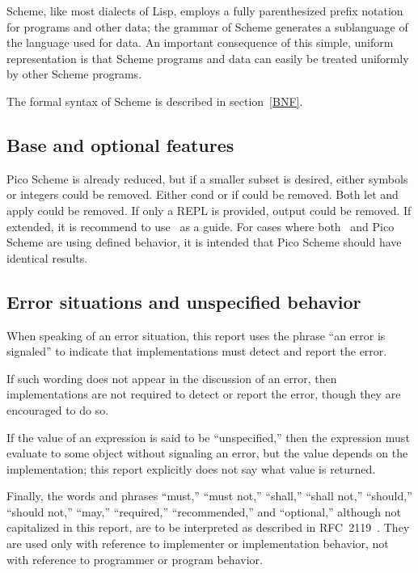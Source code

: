 Scheme, like most dialects of Lisp, employs a fully parenthesized prefix
notation for programs and other data; the grammar of Scheme generates a
sublanguage of the language used for data.  An important
consequence of this simple, uniform representation is that
Scheme programs and data can easily be treated uniformly by other Scheme programs.

The formal syntax of Scheme is described in section~\ref{BNF}.

\subsection{Base and optional features}
\label{qualifiers}

Pico Scheme is already reduced, but if a smaller subset is desired,
either symbols or integers could be removed. Either {\cf cond} or {\cf
  if} could be removed. Both {\cf let} and {\cf apply} could be
removed. If only a REPL is provided, output could be removed.
If extended, it is recommend to use \rsevenrs\ as a
guide. For cases where both \rsevenrs\ and Pico Scheme are using
defined behavior, it is intended that Pico Scheme should have
identical results.


\subsection{Error situations and unspecified behavior}
\label{errorsituations}

When speaking of an error situation, this report uses the phrase ``an
error is signaled'' to indicate that implementations must detect and
report the error.

\vest If such wording does not appear in the discussion of
an error, then implementations are not required to detect or report the
error, though they are encouraged to do so.

\vest If the value of an expression is said to be ``unspecified,'' then
the expression must evaluate to some object without signaling an error,
but the value depends on the implementation; this report explicitly does
not say what value is returned. 

\vest Finally, the words and phrases ``must,'' ``must not,'' ``shall,''
``shall not,'' ``should,'' ``should not,'' ``may,'' ``required,''
``recommended,'' and ``optional,'' although not capitalized in this
report, are to be interpreted as described in RFC~2119~\cite{rfc2119}.
They are used only with reference to implementer or implementation behavior,
not with reference to programmer or program behavior.

